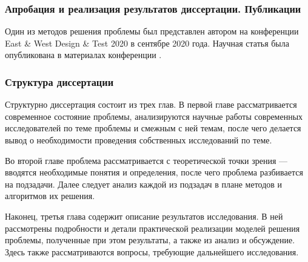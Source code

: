 \subsubsection{Апробация и реализация результатов диссертации. Публикации}
Один из методов решения проблемы был представлен автором на конференции East \& West Design \& Test 2020 в сентябре 2020 года.
Научная статья была опубликована в материалах конференции \cite{9224840}. %

\subsubsection{Структура диссертации}
Структурно диссертация состоит из трех глав. В первой главе рассматривается современное состояние проблемы, анализируются
научные работы современных исследователей по теме проблемы и смежным с ней темам, после чего делается вывод о необходимости
проведения собственных исследований по теме.

Во второй главе проблема рассматривается с теоретической точки зрения --- вводятся необходимые понятия и определения, после чего
проблема разбивается на подзадачи. Далее следует анализ каждой из подзадач в плане методов и алгоритмов их решения.

Наконец, третья глава содержит описание результатов исследования. В ней рассмотрены подробности и детали практической реализации
моделей решения проблемы, полученные при этом результаты, а также из анализ и обсуждение. Здесь также рассматриваются вопросы,
требующие дальнейшего исследования.
